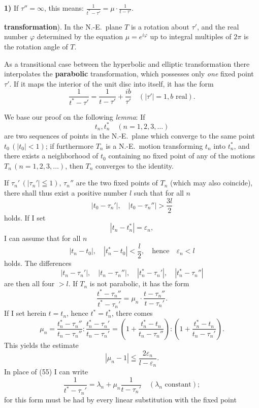 \documentclass{article}
\begin{document}
\textbf{1)} If $\tau'' = \infty$, this means: $\displaystyle\frac{1}{t^* - \tau'} = \mu \cdot \frac{1}{t - \tau'}$.

\textbf{transformation}). In the N.-E.\ plane $T$ is a rotation about $\tau'$, and the real number $\varphi$ determined by the equation $\mu = e^{i\varphi}$ up to integral multiples of $2\pi$ is the rotation angle of $T$.

As a transitional case between the hyperbolic and elliptic transformation there interpolates the \textbf{parabolic} transformation, which possesses only \emph{one} fixed point $\tau'$. If it maps the interior of the unit disc into itself, it has the form
\[ \frac{1}{t^* - \tau'} = \frac{1}{t - \tau'} + \frac{ib}{\tau'} \quad (|\tau'| = 1, b \text{ real}). \tag{54} \]

We base our proof on the following \emph{lemma}: If
\[ t_n, t_n^* \quad (n = 1, 2, 3, \dots) \]
are two sequences of points in the N.-E.\ plane which converge to the same point $t_0\,(|t_0| < 1)$; if furthermore $T_n$ is a N.-E.\ motion transforming $t_n$ into $t_n^*$, and there exists a neighborhood of $t_0$ containing no fixed point of any of the motions $T_n\,(n = 1, 2, 3, \dots)$, then $T_n$ converges to the identity.

If $\tau_n'\,(|\tau_n'| \leqq 1)$, $\tau_n''$ are the two fixed points of $T_n$ (which may also coincide), there shall thus exist a positive number $l$ such that for all $n$
\[ |t_0 - \tau_n'|, \quad |t_0 - \tau_n''| > \frac{3l}{2} \]
holds. If I set
\[ |t_n - t_n^*| = \varepsilon_n, \]
I can assume that for all $n$
\[ |t_n - t_0|, \quad |t_n^* - t_0| < \frac{l}{2}, \quad \text{hence} \quad \varepsilon_n < l \]
holds. The differences
\[ |t_n - \tau_n'|, \quad |t_n - \tau_n''|, \quad |t_n^* - \tau_n'|, \quad |t_n^* - \tau_n''| \]
are then all four $> l$. If $T_n$ is not parabolic, it has the form
\[ \frac{t^* - \tau_n''}{t^* - \tau_n'} = \mu_n \cdot \frac{t - \tau_n''}{t - \tau_n'}. \tag{55} \]
If I set herein $t = t_n$, hence $t^* = t_n^*$, there comes
\[ \mu_n = \frac{t_n^* - \tau_n''}{t_n - \tau_n''} : \frac{t_n^* - \tau_n'}{t_n - \tau_n'} = \left( 1 + \frac{t_n^* - t_n}{t_n - \tau_n''} \right) : \left( 1 + \frac{t_n^* - t_n}{t_n - \tau_n'} \right). \]
This yields the estimate
\[ |\mu_n - 1| \leqq \frac{2\varepsilon_n}{l - \varepsilon_n}. \tag{56} \]
In place of (55) I can write
\[ \frac{1}{t^* - \tau_n'} = \lambda_n + \mu_n \frac{1}{t - \tau_n'} \quad (\lambda_n \text{ constant}); \tag{57} \]
for this form must be had by every linear substitution with the fixed point
\end{document}
